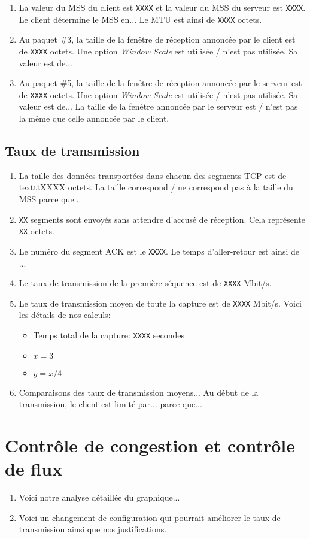 \documentclass[]{article}
\begin{document}
\begin{enumerate}
      \item La valeur du MSS du client est \texttt{XXXX} et la valeur du MSS du serveur est \texttt{XXXX}.
            Le client détermine le MSS en... Le MTU est ainsi de \texttt{XXXX} octets.
      \item Au paquet \#3, la taille de la fenêtre de réception annoncée par le client est de \texttt{XXXX}
            octets. Une option \textit{Window Scale} est utilisée / n'est pas utilisée. Sa valeur est de...
      \item Au paquet \#5, la taille de la fenêtre de réception annoncée par le serveur est de \texttt{XXXX}
            octets. Une option \textit{Window Scale} est utilisée / n'est pas utilisée. Sa valeur est de...
            La taille de la fenêtre annoncée par le serveur est / n'est pas la même que celle annoncée par
            le client.
\end{enumerate}

\subsection*{Taux de transmission}

\begin{enumerate}
      \item La taille des données transportées dans chacun des segments TCP est de texttt{XXXX} octets.
            La taille correspond / ne correspond pas à la taille du MSS parce que...

      \item \texttt{XX} segments sont envoyés sans attendre d'accusé de réception. Cela représente \texttt{XX}
            octets.
      \item Le numéro du segment ACK est le \texttt{XXXX}. Le temps d'aller-retour est ainsi de ...
      \item Le taux de transmission de la première séquence est de \texttt{XXXX} Mbit/s.
      \item Le taux de transmission moyen de toute la capture est de \texttt{XXXX} Mbit/s. Voici les détails
            de nos calculs:
            \begin{itemize}
                  \item Temps total de la capture: \texttt{XXXX} secondes
                  \item $x = 3$
                  \item $y = x/4$
            \end{itemize}
      \item Comparaisons des taux de transmission moyens... Au début de la transmission, le client est limité
            par... parce que...
\end{enumerate}

\section*{Contrôle de congestion et contrôle de flux}

\begin{enumerate}
      \item Voici notre analyse détaillée du graphique...
      \item Voici un changement de configuration qui pourrait améliorer le taux de transmission ainsi que nos
            justifications.
\end{enumerate}
\end{document}
